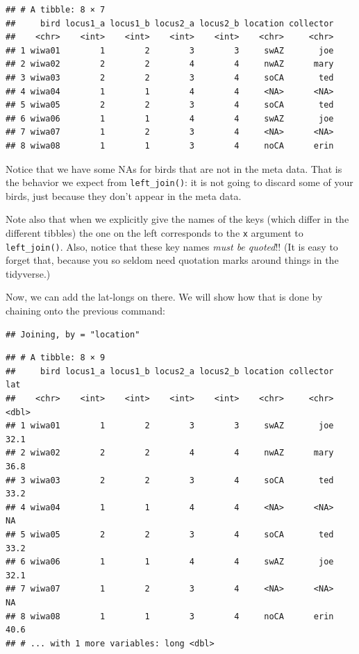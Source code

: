 \documentclass[]{book}
\newenvironment{Shaded}{\begin{snugshade}}{\end{snugshade}}
\newcommand{\KeywordTok}[1]{\textcolor[rgb]{0.13,0.29,0.53}{\textbf{{#1}}}}
\newcommand{\DataTypeTok}[1]{\textcolor[rgb]{0.13,0.29,0.53}{{#1}}}
\newcommand{\StringTok}[1]{\textcolor[rgb]{0.31,0.60,0.02}{{#1}}}
\newcommand{\NormalTok}[1]{{#1}}
\theoremstyle{definition}
\theoremstyle{definition}
\theoremstyle{remark}
\begin{document}
\begin{verbatim}
## # A tibble: 8 × 7
##     bird locus1_a locus1_b locus2_a locus2_b location collector
##    <chr>    <int>    <int>    <int>    <int>    <chr>     <chr>
## 1 wiwa01        1        2        3        3     swAZ       joe
## 2 wiwa02        2        2        4        4     nwAZ      mary
## 3 wiwa03        2        2        3        4     soCA       ted
## 4 wiwa04        1        1        4        4     <NA>      <NA>
## 5 wiwa05        2        2        3        4     soCA       ted
## 6 wiwa06        1        1        4        4     swAZ       joe
## 7 wiwa07        1        2        3        4     <NA>      <NA>
## 8 wiwa08        1        1        3        4     noCA      erin
\end{verbatim}

Notice that we have some NAs for birds that are not in the meta data.
That is the behavior we expect from \texttt{left\_join()}: it is not
going to discard some of your birds, just because they don't appear in
the meta data.

Note also that when we explicitly give the names of the keys (which
differ in the different tibbles) the one on the left corresponds to the
\texttt{x} argument to \texttt{left\_join()}. Also, notice that these
key names \emph{must be quoted}!! (It is easy to forget that, because
you so seldom need quotation marks around things in the tidyverse.)

Now, we can add the lat-longs on there. We will show how that is done by
chaining onto the previous command:

\begin{Shaded}
\end{Shaded}

\begin{verbatim}
## Joining, by = "location"
\end{verbatim}

\begin{verbatim}
## # A tibble: 8 × 9
##     bird locus1_a locus1_b locus2_a locus2_b location collector   lat
##    <chr>    <int>    <int>    <int>    <int>    <chr>     <chr> <dbl>
## 1 wiwa01        1        2        3        3     swAZ       joe  32.1
## 2 wiwa02        2        2        4        4     nwAZ      mary  36.8
## 3 wiwa03        2        2        3        4     soCA       ted  33.2
## 4 wiwa04        1        1        4        4     <NA>      <NA>    NA
## 5 wiwa05        2        2        3        4     soCA       ted  33.2
## 6 wiwa06        1        1        4        4     swAZ       joe  32.1
## 7 wiwa07        1        2        3        4     <NA>      <NA>    NA
## 8 wiwa08        1        1        3        4     noCA      erin  40.6
## # ... with 1 more variables: long <dbl>
\end{verbatim}
\end{document}
